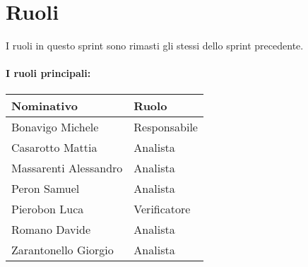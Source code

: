 \section{Ruoli}

I ruoli in questo sprint sono rimasti gli stessi dello sprint precedente.

\paragraph{I ruoli principali:}

\begin{center}
    \begin{tabularx}{\textwidth}{X l}
        
        \rowcolor{gray!30} \textbf{Nominativo} & \textbf{Ruolo}\\
        
        \hline

        Bonavigo Michele & Responsabile \\
        \rowcolor{gray!10}Casarotto Mattia & Analista \\
        Massarenti Alessandro & Analista \\
        \rowcolor{gray!10}Peron Samuel & Analista \\
        Pierobon Luca & Verificatore \\
        \rowcolor{gray!10}Romano Davide & Analista \\
        Zarantonello Giorgio & Analista \\

    \end{tabularx}
\end{center}

